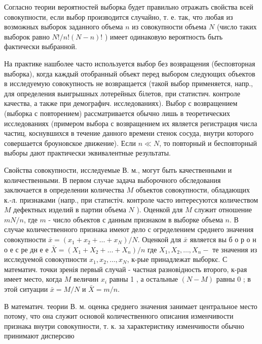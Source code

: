 \documentclass[10pt]{article}
\begin{document}
Согласно теории вероятностей выборка будет правильно отражать свойства всей совокупности, если выбор производится случайно, т. е. так, что любая из возможных выборок заданного объема $n$ из совокупности объема $N$ (число таких выборок равно $N ! / n !(N-n) !$ ) имеет одинаковую вероятность быть фактически выбранной.



На практике нашболее часто используется выбор без возвращения (бесповторная выборка), когда каждый отобранный объект перед выбором следующих объектов в исследуемую совокупность не возвращается (такой выбор применяется, напр., для определения выигрышных лотерейных білетов, при статистич. контроле качества, а также при демографич. исследованиях). Выбор с возвращением (выборка с повторением) рассматривается обычно лишь в теоретических исследованиях (примером выбора с возвращением их является регистрация числа частиц, коснувшихся в течение данного времени стенок сосуда, внутри которого совершается броуновское движение). Если $n \ll N$, то повторный и бесповторный выборы дают практически эквивалентные результаты.



Свойства совокупности, исследуемые В. м., могут быть качественными и количественными. В первом случае задача выборочного обследования заключается в определении количества $M$ объектов совокупности, обладающих к.-л. признаками (напр., при статистіч. контроле часто интересуются количеством $M$ дефектных изделий в партии объема $N$ ). Оценкой для $M$ служит отношение $m N / n$, где $m$ - число объектов с данным признаком в выборке объема $n$. В случае количественного признака имеют дело с огределением среднего значения совокупности $\bar{x}=\left(x_{1}+x_{2}+\ldots+x_{N}\right) / N$. Оценкой для $\bar{x}$ является вы б о р о н о е с ре дн е е $\bar{X}=\left(X_{1}+X_{2}+\ldots+X_{n}\right) / n$ где $X_{1}, X_{2}, \ldots, X_{n}-$ те значения из исследуемой совокупности $x_{1}, x_{2}, \ldots, x_{N}$, к-рые принадлежат выборкє. С математич. точки зренія первый случай - частная разновідность второго, к-рая имеет место, когда $M$ величин $x_{i}$ равны 1 , а остальные $(N-M)$ равны 0 ; в этой ситуации $\bar{x}=M / N$ и $\bar{X}=m / n$.



В математич. теории В. м. оценка среднего значения занимает центральное место потому, что она служит основой количественного описания изменчивости признака внутри совокупности, т. к. за характеристику изменчивости обычно принимают дисперсию
\end{document}
